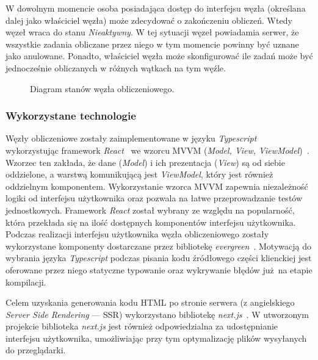 \documentclass[a4paper,11pt,twoside]{report}
\theoremstyle{definition}
\begin{document}
W dowolnym momencie osoba posiadająca dostęp do interfejsu węzła (określana dalej jako właściciel węzła) może zdecydować o zakończeniu obliczeń. Wtedy węzeł wraca do stanu \textit{Nieaktywny}. W tej sytuacji węzeł powiadamia serwer, że wszystkie zadania obliczane przez niego w tym momencie powinny być uznane jako anulowane.
Ponadto, właściciel węzła może skonfigurować ile zadań może być jednocześnie obliczanych w różnych wątkach na tym węźle.

\begin{figure} 
    \caption{Diagram stanów węzła obliczeniowego.}
    \label{node-state}
\end{figure}

\subsubsection{Wykorzystane technologie}
Węzły obliczeniowe zostały zaimplementowane w języku \textit{Typescript}~\cite{typescript} wykorzystując framework \textit{React}~\cite{react} we wzorcu MVVM (\textit{Model, View, ViewModel})~\cite{mvvm}.
Wzorzec ten zakłada, że dane (\textit{Model}) i ich prezentacja (\textit{View}) są od siebie oddzielone, a warstwą komunikującą jest \textit{ViewModel}, który jest również oddzielnym komponentem.
Wykorzystanie wzorca MVVM zapewnia niezależność logiki od interfejsu użytkownika oraz pozwala na łatwe przeprowadzanie testów jednostkowych.
Framework \textit{React} został wybrany ze względu na popularność, która przekłada się na ilość dostępnych komponentów interfejsu użytkownika.
Podczas realizacji interfejsu użytkownika węzła obliczeniowego zostały wykorzystane komponenty dostarczane przez bibliotekę \textit{evergreen}~\cite{evergreen}.
Motywacją do wybrania języka \textit{Typescript} podczas pisania kodu źródłowego części klienckiej jest oferowane przez niego statyczne typowanie oraz wykrywanie błędów już na etapie kompilacji.

Celem uzyskania generowania kodu HTML po stronie serwera (z angielskiego \textit{Server Side Rendering} --- SSR) wykorzystano bibliotekę \textit{next.js}~\cite{next.js}. W utworzonym projekcie biblioteka \textit{next.js} jest również odpowiedzialna za udostępnianie interfejsu użytkownika, umożliwiając przy tym optymalizację plików wysyłanych do przeglądarki.
\end{document}
